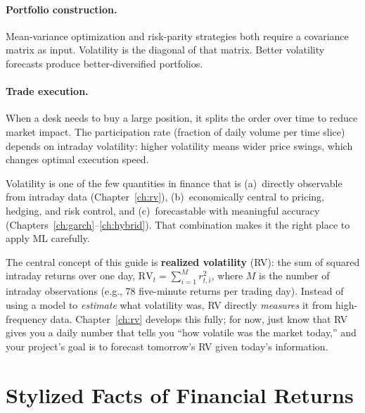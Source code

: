 \paragraph{Portfolio construction.}
Mean-variance optimization \citep{Markowitz1952} and risk-parity strategies both require a covariance matrix as input.
Volatility is the diagonal of that matrix.
Better volatility forecasts produce better-diversified portfolios.

\paragraph{Trade execution.}
When a desk needs to buy a large position, it splits the order over time to reduce market impact.
The participation rate (fraction of daily volume per time slice) depends on intraday volatility: higher volatility means wider price swings, which changes optimal execution speed.

\begin{keyidea}
Volatility is one of the few quantities in finance that is (a)~directly observable from intraday data (Chapter~\ref{ch:rv}), (b)~economically central to pricing, hedging, and risk control, and (c)~forecastable with meaningful accuracy (Chapters~\ref{ch:garch}--\ref{ch:hybrid}).
That combination makes it the right place to apply ML carefully.
\end{keyidea}

\begin{prereq}
The central concept of this guide is \textbf{realized volatility} (RV): the sum of squared intraday returns over one day,
$\text{RV}_t = \sum_{i=1}^{M} r_{t,i}^2$,
where $M$ is the number of intraday observations (e.g., 78 five-minute returns per trading day).
Instead of using a model to \emph{estimate} what volatility was, RV directly \emph{measures} it from high-frequency data.
Chapter~\ref{ch:rv} develops this fully; for now, just know that RV gives you a daily number that tells you ``how volatile was the market today,'' and your project's goal is to forecast tomorrow's RV given today's information.
\end{prereq}

\section{Stylized Facts of Financial Returns}
\label{sec:stylized-facts}

